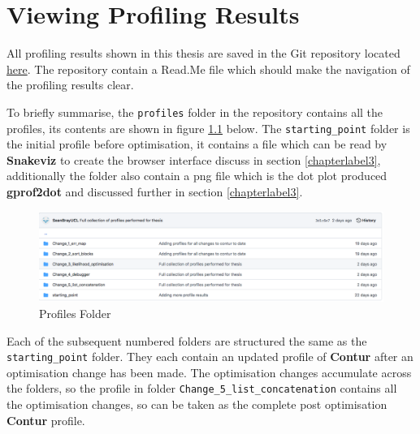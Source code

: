 {}

\appendix
\chapter{Viewing Profiling Results}
\label{appendixlabel1}
All profiling results shown in this thesis are saved in the Git repository located \href{https://github.com/SeanBrayUCL/contur_thesis}{here}. The repository contain a Read.Me file which should make the navigation of the profiling results clear. 

To briefly summarise, the \texttt{profiles} folder in the repository contains all the profiles, its contents are shown in figure \ref{fig:profiles_folder} below. The \texttt{starting\_point} folder is the initial profile before optimisation, it contains a  file which can be read by \textbf{Snakeviz} to create the browser interface discuss in section \ref{chapterlabel3}, additionally the folder also contain a png file which is the dot plot produced \textbf{gprof2dot} and discussed further in section \ref{chapterlabel3}.

\begin{figure}[H]
\centering
\includegraphics[scale=0.3]{plots/profiles_folder.png}
\caption{Profiles Folder}
\label{fig:profiles_folder}
\end{figure}

Each of the subsequent numbered folders are structured the same as the \texttt{starting\_point} folder. They each contain an updated profile of \textbf{Contur} after an optimisation change has been made. The optimisation changes accumulate across the folders, so the profile in folder \texttt{Change\_5\_list\_concatenation} contains all the optimisation changes, so can be taken as the complete post optimisation \textbf{Contur} profile.


